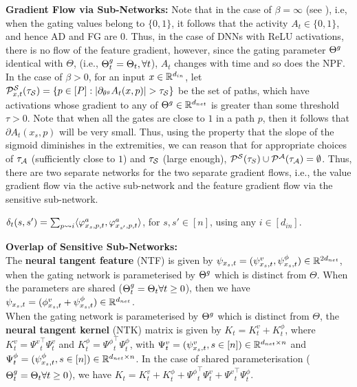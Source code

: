 \textbf{Gradient Flow via Sub-Networks:} Note that in the case of $\beta=\infty$ (see ), i.e, when the gating values belong to $\{0,1\}$, it follows that the activity $A_t\in\{0,1\}$, and hence AD and FG are $0$. Thus, in the case of DNNs with ReLU activations, there is no flow of the feature gradient, however, since the gating parameter $\Tg$ identical with $\Theta$, (i.e., $\Tg_t=\Theta_t,\forall t$), $A_t$ changes with time and so does the NPF. In the case of $\beta>0$, for an input $x\in\R^{d_{in}}$, let $\P^{\S}_{x,t}(\tau_{\S})=\{p\in[P]: |\partial_{\tg} A_t(x,p)|>\tau_{\S}\}$ be the set of paths, which have activations whose gradient to any of $\Tg\inrdnet$ is greater than some threshold $\tau>0$. Note that when all the gates are close to $1$ in a path $p$, then it follows that $\partial A_t(x_s,p)$ will be very small. Thus, using the property that the slope of the sigmoid diminishes in the extremities, we can reason that for appropriate choices of $\tau_{\A}$ (sufficiently close to $1$) and $\tau_{\S}$ (large enough), $\P^{\S}(\tau_{S})\cup \P^{\A}(\tau_{\A})=\emptyset$. Thus, there are two separate networks for the two separate gradient flows, i.e., the value gradient flow via the active sub-network and the feature gradient flow via the sensitive sub-network.\\
\begin{definition}\label{def:delta}
$\delta_t(s,s')=\sum_{p\rsa i} \ip{\varphi^a_{x_s,p,t},\varphi^a_{x_{s'},p,t}}$, for $s,s'\in[n]$, using any $i\in[d_{in}]$.
\end{definition}
\textbf{Overlap of Sensitive Sub-Networks:} \\

The \textbf{neural tangent feature} (NTF) is given by $\psi_{x_s,t}=(\psi^v_{x_s,t},\psi^{\phi}_{x_s,t})\in\R^{2d_{net}}$, when the gating network is parameterised by $\Tg$ which is distinct from $\Theta$. When the parameters are shared ($\Tg_t=\Theta_t\forall t\geq 0$), then we have $\psi_{x_s,t}=(\phi^v_{x_s,t}+\psi^{\phi}_{x_s,t})\in\R^{d_{net}}$.\\
When the gating network is parameterised by $\Tg$ which is distinct from $\Theta$, the \textbf{neural tangent kernel} (NTK) matrix is given by $K_t=K^v_t+K^{\phi}_t$, where $K^v_t={\Psi^{v}}^\top_t\Psi^v_t$ and $K^{\phi}_t={\Psi^{\phi}}^\top_t\Psi^{\phi}_t$, with $\Psi^v_t=(\psi^v_{x_s,t},s\in[n])\in\R^{d_{net}\times n}$ and $\Psi^{\phi}_t=(\psi^{\phi}_{x_s,t},s\in[n])\in\R^{d_{net}\times n}$. In the case of shared parameterisation ($\Tg_t=\Theta_t\forall t\geq 0$), we have $K_t=K^v_t+K^{\phi}_t+{\Psi^{\phi}}^\top_t\Psi^v_t+ {\Psi^{v}}^\top_t\Psi^{\phi}_t$.
